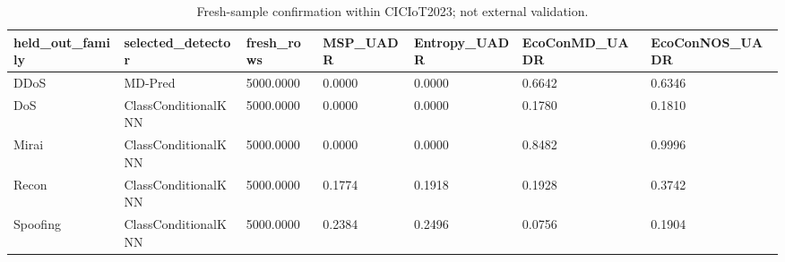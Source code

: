 \begin{table}
\caption{Fresh-sample confirmation within CICIoT2023; not external validation.}
\label{tab:table09_fresh_confirmation}
\begin{tabular}{lllllll}
\toprule
held\_out\_family & selected\_detector & fresh\_rows & MSP\_UADR & Entropy\_UADR & EcoConMD\_UADR & EcoConNOS\_UADR \\
\midrule
DDoS & MD-Pred & 5000.0000 & 0.0000 & 0.0000 & 0.6642 & 0.6346 \\
DoS & ClassConditionalKNN & 5000.0000 & 0.0000 & 0.0000 & 0.1780 & 0.1810 \\
Mirai & ClassConditionalKNN & 5000.0000 & 0.0000 & 0.0000 & 0.8482 & 0.9996 \\
Recon & ClassConditionalKNN & 5000.0000 & 0.1774 & 0.1918 & 0.1928 & 0.3742 \\
Spoofing & ClassConditionalKNN & 5000.0000 & 0.2384 & 0.2496 & 0.0756 & 0.1904 \\
\bottomrule
\end{tabular}
\end{table}
